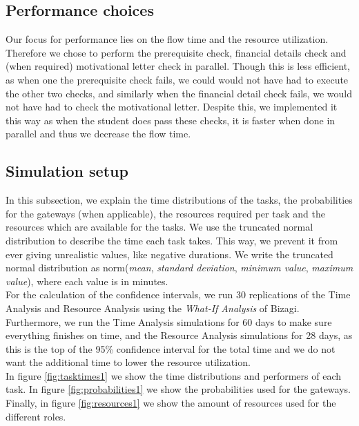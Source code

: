 
\subsection{Performance choices}
Our focus for performance lies on the flow time and the resource utilization. Therefore we chose to perform the prerequisite check, financial details check and (when required) motivational letter check in parallel. Though this is less efficient, as when one the prerequisite check fails, we could would not have had to execute the other two checks, and similarly when the financial detail check fails, we would not have had to check the motivational letter. Despite this, we implemented it this way as when the student does pass these checks, it is faster when done in parallel and thus we decrease the flow time.

\subsection{Simulation setup}
In this subsection, we explain the time distributions of the tasks, the probabilities for the gateways (when applicable), the resources required per task and the resources which are available for the tasks. We use the truncated normal distribution to describe the time each task takes. This way, we prevent it from ever giving unrealistic values, like negative durations. We write the truncated normal distribution as norm(\textit{mean}, \textit{standard deviation}, \textit{minimum value}, \textit{maximum value}), where each value is in minutes.\\
For the calculation of the confidence intervals, we run 30 replications of the Time Analysis and Resource Analysis using the \textit{What-If Analysis} of Bizagi. Furthermore, we run the Time Analysis simulations for 60 days to make sure everything finishes on time, and the Resource Analysis simulations for 28 days, as this is the top of the 95\% confidence interval for the total time and we do not want the additional time to lower the resource utilization.\\
In figure \ref{fig:tasktimes1} we show the time distributions and performers of each task. In figure \ref{fig:probabilities1} we show the probabilities used for the gateways. Finally, in figure \ref{fig:resources1} we show the amount of resources used for the different roles.

